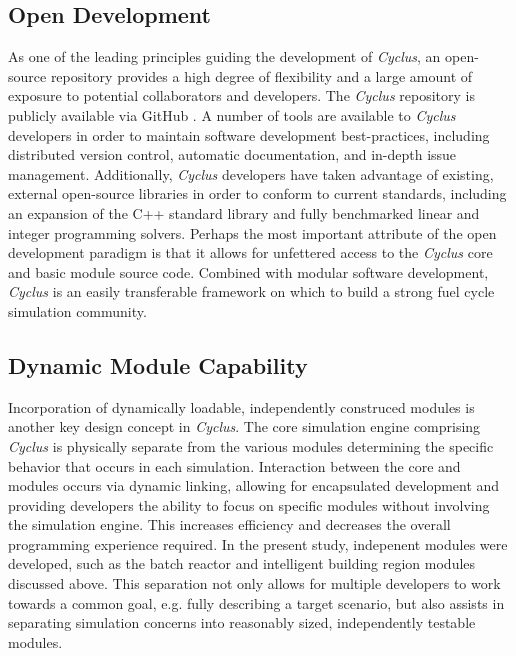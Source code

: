 \documentclass{anstrans}
\begin{document}
\subsection{Open Development}
As one of the leading principles guiding the development of \emph{Cyclus}, an open-source repository provides a high degree of flexibility 
and a large amount of exposure to potential collaborators and developers. The \emph{Cyclus} repository is publicly available via 
GitHub \cite{cyclus2012}. A number of tools are available to \emph{Cyclus} developers in order to maintain software development best-practices, 
including distributed version control, automatic documentation, and in-depth issue management. Additionally, \emph{Cyclus} developers have taken 
advantage of existing, external open-source libraries in order to conform to current standards, including an expansion of the C++ standard
library and fully benchmarked linear and integer programming solvers. Perhaps the most important attribute of the open development paradigm 
is that it allows for unfettered access to the \emph{Cyclus} core and basic module source code. Combined with modular software development, \emph{Cyclus} 
is an easily transferable framework on which to build a strong fuel cycle simulation community.
\subsection{Dynamic Module Capability}
Incorporation of dynamically loadable, independently construced modules is another key design concept in \emph{Cyclus}. The core simulation engine 
comprising \emph{Cyclus} is physically separate from the various modules determining the specific behavior that occurs in each simulation. 
Interaction between the core and modules occurs via dynamic linking, allowing for encapsulated development and providing developers the ability 
to focus on specific modules without involving the simulation engine. This increases efficiency and decreases the overall programming experience 
required. In the present study, indepenent modules were developed, such as the batch reactor and intelligent building region modules discussed 
above. This separation not only allows for multiple developers to work towards a common goal, e.g. fully describing a target scenario, but
also assists in separating simulation concerns into reasonably sized, independently testable modules.
\end{document}
